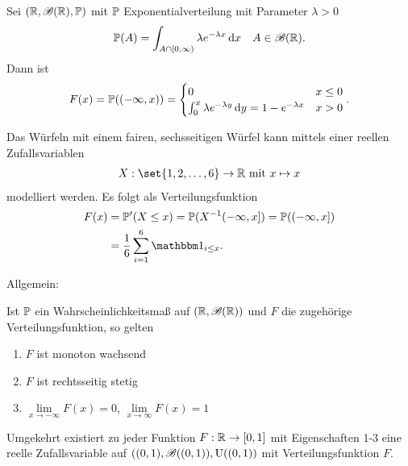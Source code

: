 
\begin{example}
	Sei $(\mathbb{R}, \mathscr{B}(\mathbb{R}),\mathbb{P})$ mit $\mathbb{P}$ Exponentialverteilung mit Parameter $\lambda > 0$
	\begin{align}
		\mathbb{P}(A) = \int_{A \cap [0,\infty)}\lambda e^{-\lambda x} \,\mathrm{d} x \quad A \in \mathscr{B}(\mathbb{R}).\notag
	\end{align}
	Dann ist
	\begin{align}
		F(x) = \mathbb{P}((-\infty, x)) = \begin{cases}
		0 &x \le 0\\
		\int_{0}^{x} \lambda e^{-\lambda y} \,\mathrm{d} y = 1 - e^{-\lambda x} &x > 0
		\end{cases}.\notag
	\end{align}
\end{example}

\begin{center}
	
\end{center}

\begin{example}
	Das Würfeln mit einem fairen, sechsseitigen Würfel kann mittels einer reellen Zufallsvariablen
	\begin{align}
		X: \set{1,2,\dots, 6} \to \R \mit x \mapsto x\notag
	\end{align}
	modelliert werden. Es folgt als Verteilungsfunktion
	\begin{align}
		F(x) &= \probp'(X \le x) = \probp(X^{-1}(-\infty,x]) = \probp((-\infty,x])\notag\\
		&= \frac{1}{6}\sum_{i=1}^{6} \indi_{i \le x}.\notag
	\end{align}
\end{example}

\begin{center}
	
\end{center}

Allgemein:

\begin{proposition}
	Ist $\mathbb{P}$ ein Wahrscheinlichkeitsmaß auf $(\mathbb{R}, \mathscr{B}(\mathbb{R}))$ und $F$ die zugehörige Verteilungsfunktion, so gelten
	\begin{enumerate}
		\item $F$ ist monoton wachsend
		\item $F$ ist rechtsseitig stetig
		\item $\lim\limits_{x\to -\infty} F(x) = 0$, $\lim\limits_{x\to \infty} F(x) = 1$
	\end{enumerate}
	Umgekehrt existiert zu jeder Funktion $F: \mathbb{R} \to [0,1]$ mit Eigenschaften 1-3 eine reelle Zufallsvariable auf $((0,1), \mathscr{B}((0,1)), \operatorname{U}((0,1))$ mit Verteilungsfunktion $F$.
\end{proposition}

